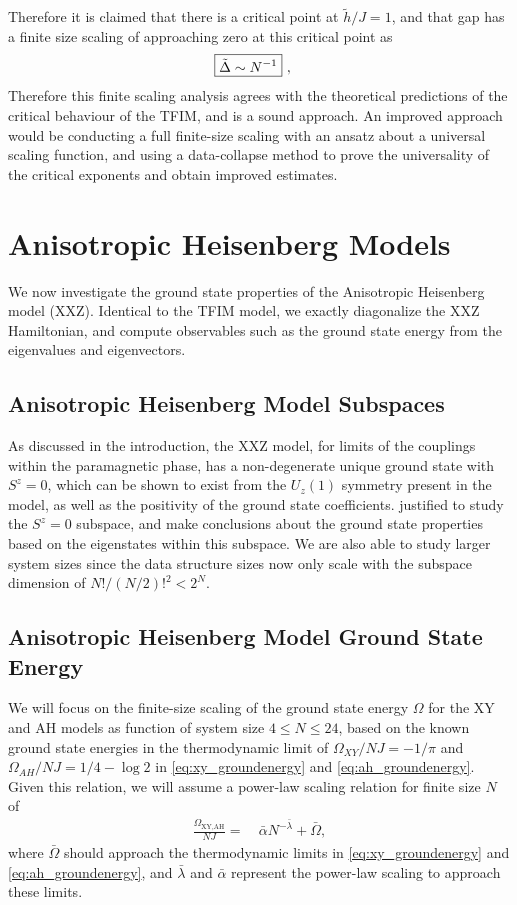 \documentclass[12pt]{article}{}
\begin{document}
Therefore it is claimed that there is a critical point at $\tilde{h}/J = 1$, and that gap has a finite size scaling of approaching zero at this critical point as
\begin{align}
  \Aboxed{\tilde{\Delta} \sim N^{-1}}~, \label{eq:ising_criticalscaling}
\end{align}
Therefore this finite scaling analysis agrees with the theoretical predictions of the critical behaviour of the TFIM, and is a sound approach. An improved approach would be conducting a full finite-size scaling with an ansatz about a universal scaling function, and using a data-collapse method to prove the universality of the critical exponents and obtain improved estimates.

\newpage
\section{Anisotropic Heisenberg Models}
We now investigate the ground state properties of the Anisotropic Heisenberg model (XXZ). Identical to the TFIM model, we exactly diagonalize the XXZ Hamiltonian, and compute observables such as the ground state energy from the eigenvalues and eigenvectors. 

\subsection{Anisotropic Heisenberg Model Subspaces}
As discussed in the introduction, the XXZ model, for limits of the couplings within the paramagnetic phase, has a non-degenerate unique ground state with $S^{z} = 0$, which can be shown to exist from the $U_z(1)$ symmetry present in the model, as well as the positivity of the ground state coefficients. justified to study the $S^{z} = 0$ subspace, and make conclusions about the ground state properties based on the eigenstates within this subspace. We are also able to study larger system sizes since the data structure sizes now only scale with the subspace dimension of $N!/(N/2)!^2 < 2^N$.

\subsection{Anisotropic Heisenberg Model Ground State Energy}
We will focus on the finite-size scaling of the ground state energy $\Omega$ for the XY and AH models as function of system size $4 \leq N \leq 24$, based on the known ground state energies in the thermodynamic limit of $\Omega_{XY}/{NJ} = -1/\pi$ and $\Omega_{AH}/{NJ} = 1/4 - \log2$ in \cref{eq:xy_groundenergy} and \cref{eq:ah_groundenergy}. Given this relation, we will assume a power-law scaling relation for finite size $N$ of
\begin{align}
  \frac{\Omega_{\textrm{XY,AH}}}{NJ} =&~ \bar{\alpha} N^{-\bar{\lambda}} + \bar{\Omega}, \label{eq:xyah_energyscaling}
\end{align}
where $\bar{\Omega}$ should approach the thermodynamic limits in \cref{eq:xy_groundenergy} and \cref{eq:ah_groundenergy}, and $\bar{\lambda}$ and $\bar{\alpha}$ represent the power-law scaling to approach these limits.
\end{document}
